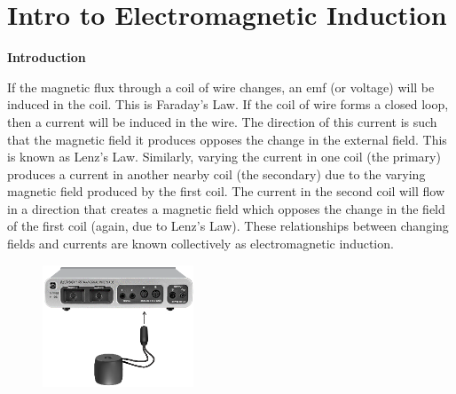 \section{Intro to Electromagnetic Induction}
\label{induction_intro}

\makelabheader %



\bigskip

\textbf{Introduction} 

If the magnetic flux through a coil of wire changes, an emf (or voltage) 
will be induced in the coil. This is Faraday's Law. If the coil of wire 
forms a closed loop, then a current will be induced in the wire. The direction 
of this current is such that the magnetic field it produces opposes the change 
in the external field. This is known as Lenz's Law. Similarly, varying the 
current in one coil (the primary) produces a current in another nearby coil 
(the secondary) due to the varying magnetic field produced by the first coil. 
The current in the second coil will flow in a direction that creates a magnetic
field which opposes the change in the field of the first coil (again, due to 
Lenz's Law). These relationships between changing fields and currents are known 
collectively as electromagnetic induction.

\bigskip

\begin{figure}
\vspace{-0.5in}
    \includegraphics[width=0.4\textwidth]{induction_intro/induction1_setup_550.eps}
\end{figure}

